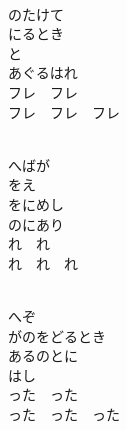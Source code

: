 \documentclass[10pt,b5j]{tarticle} %
\begin{document}
\vspace{1.5em} %
\newcommand{\linespace}{0.5em} %
\newcommand{\blocksize}{0.5\hsize} %
\newcommand{\itemmargin}{6em} %
\begin{enumerate} %
    \setlength{\itemindent}{\itemmargin} %
    \begin{minipage}[c]{\blocksize}
    
        \vspace{\linespace}
        \item~\\
        のたけて\\
        にるとき\\
        と\\
        あぐるはれ\\
        フレ　フレ\\
        フレ　フレ　フレ
        
        \vspace{\linespace}
        \item~\\
        へばが\\
        をえ\\
        をにめし\\
        のにあり\\
        れ　れ\\
        れ　れ　れ
        
        \vspace{\linespace}
        \item~\\
        へぞ\\
        がのをどるとき\\
        あるのとに\\
        はし\\
        った　った\\
        った　った　った
    
    \end{minipage}
\end{enumerate} %
\end{document}
